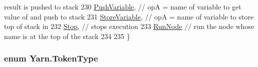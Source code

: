 \begin{DoxyCode}
{       result is pushed to stack}
230         \hyperlink{a00040_ad5dfb6ee68ca7469623ad3e459f98894ab8c46f65015a178516fadbb5ad6c2038}{PushVariable},               \textcolor{comment}{// opA = name of variable to get value of and push to stack}
231         \hyperlink{a00040_ad5dfb6ee68ca7469623ad3e459f98894a872dc050abaff4beb46e70dadd4088c2}{StoreVariable},             \textcolor{comment}{// opA = name of variable to store top of stack in}
232         \hyperlink{a00040_ad5dfb6ee68ca7469623ad3e459f98894a11a755d598c0c417f9a36758c3da7481}{Stop},               \textcolor{comment}{// stops execution}
233         \hyperlink{a00040_ad5dfb6ee68ca7469623ad3e459f98894ae956bcf888278c168ee9b106927ff6ac}{RunNode}              \textcolor{comment}{// run the node whose name is at the top of the stack}
234 
235     \}
\end{DoxyCode}
\hypertarget{a00040_a301aa7c866593a5b625a8fc158bbeace}{
\subsubsection[{Token\-Type}]{\setlength{\rightskip}{0pt plus 5cm}enum {\bf Yarn.\-Token\-Type}\hspace{0.3cm}{\ttfamily [package]}}}\label{a00040_a301aa7c866593a5b625a8fc158bbeace}
